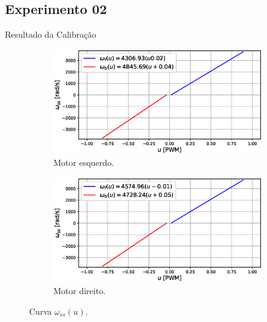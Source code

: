 \subsection{Experimento 02}
\begin{frame}{Resultado da Calibração}

\begin{figure}
    \begin{subfigure}{.48\textwidth}
    \centering
        \includegraphics[width=1.15\textwidth]{figuras/resultados/exp02/curva_feedforward_esquerdo100.eps}
        \caption{Motor esquerdo.}
    \end{subfigure}
    \begin{subfigure}{.48\textwidth}
        \centering
        \includegraphics[width=1.15\textwidth]{figuras/resultados/exp02/curva_feedforward_direito100.eps}
        \caption{Motor direito.}
    \end{subfigure}
    \caption{Curva $\omega_{ss}(u)$.}
\end{figure}

\end{frame}

